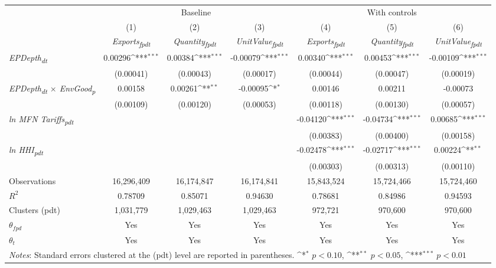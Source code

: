 {
\def\sym#1{\ifmmode^{#1}\else\(^{#1}\)\fi}
\begin{tabular}{l*{6}{c}}
\toprule
&\multicolumn{3}{c}{Baseline}&\multicolumn{3}{c}{With controls}\\\cmidrule(lr){2-4}\cmidrule(lr){5-7}
&(1)&(2)&(3)&(4)&(5)&(6)\\
&\textit{Exports\textsubscript{fpdt}}&\textit{Quantity\textsubscript{fpdt}}&\textit{UnitValue\textsubscript{fpdt}}&\textit{Exports\textsubscript{fpdt}}&\textit{Quantity\textsubscript{fpdt}}&\textit{UnitValue\textsubscript{fpdt}}\\
\midrule
\textit{EPDepth\textsubscript{dt}} & 0.00296\sym{***} & 0.00384\sym{***} & -0.00079\sym{***} & 0.00340\sym{***} & 0.00453\sym{***} & -0.00109\sym{***}\\
 & (0.00041) & (0.00043) & (0.00017) & (0.00044) & (0.00047) & (0.00019)\\
\addlinespace
\textit{EPDepth\textsubscript{dt} $\times$ EnvGood\textsubscript{p}} & 0.00158 & 0.00261\sym{**} & -0.00095\sym{*} & 0.00146 & 0.00211 & -0.00073\\
 & (0.00109) & (0.00120) & (0.00053) & (0.00118) & (0.00130) & (0.00057)\\
\addlinespace
\textit{ln MFN Tariffs\textsubscript{pdt}} &  &  &  & -0.04120\sym{***} & -0.04734\sym{***} & 0.00685\sym{***}\\
 &  &  &  & (0.00383) & (0.00400) & (0.00158)\\
\addlinespace
\textit{ln HHI\textsubscript{pdt}} &  &  &  & -0.02478\sym{***} & -0.02717\sym{***} & 0.00224\sym{**}\\
 &  &  &  & (0.00303) & (0.00313) & (0.00110)\\
\midrule
Observations & 16,296,409 & 16,174,847 & 16,174,841 & 15,843,524 & 15,724,466 & 15,724,460\\
$R^{2}$ & 0.78709 & 0.85071 & 0.94630 & 0.78681 & 0.84986 & 0.94593\\
Clusters (pdt) & 1,031,779 & 1,029,463 & 1,029,463 & 972,721 & 970,600 & 970,600\\
$\theta_{fpd}$ & Yes & Yes & Yes & Yes & Yes & Yes\\
$\theta_{t}$ & Yes & Yes & Yes & Yes & Yes & Yes\\
\bottomrule
\multicolumn{7}{l}{\footnotesize \textit{Notes}: Standard errors clustered at the (pdt) level are reported in parentheses. \sym{*} \(p<0.10\), \sym{**} \(p<0.05\), \sym{***} \(p<0.01\)}\\
\end{tabular}
}
